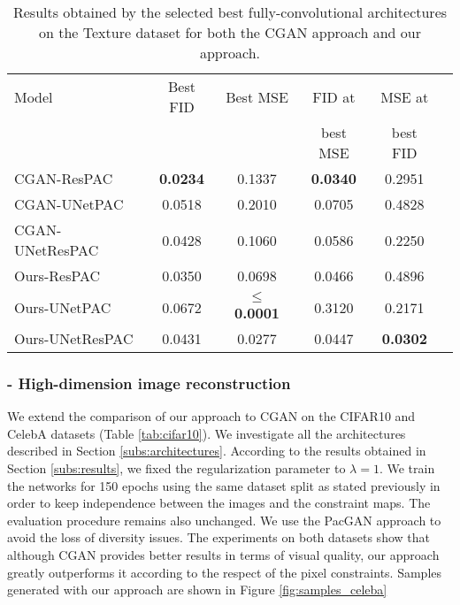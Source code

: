 \begin{table}[t]
	\centering
	\begin{tabular}{|l|c|c|c|c|c|}
		\hline
		Model           & Best FID & Best MSE & FID at & MSE at \\
		&&&best MSE & best FID  \\
		\hline
		CGAN-ResPAC &   \textbf{0.0234} & 0.1337 &  \textbf{0.0340} & 0.2951 \\
		CGAN-UNetPAC &  0.0518 & 0.2010 & 0.0705 & 0.4828\\
		CGAN-UNetResPAC & 0.0428 & 0.1060 & 0.0586 & 0.2250\\
		\hline
		Ours-ResPAC &  0.0350 & 0.0698 & 0.0466 & 0.4896\\
		Ours-UNetPAC &  0.0672 & \textbf{$\leq$ 0.0001}  & 0.3120 & 0.2171 \\
		Ours-UNetResPAC & 0.0431 & 0.0277 &0.0447 & \textbf{0.0302}\\
		\hline
	\end{tabular}
	
	\caption[Results obtained by the selected best fully-convolutional architectures]{Results obtained by the selected best fully-convolutional architectures on the Texture dataset for both the CGAN approach and our approach.}
	\label{tab:ablation-cgan}
\end{table}

\subsubsection{- High-dimension image reconstruction}
We extend the comparison of our approach to CGAN on the CIFAR10 and CelebA  datasets (Table \ref{tab:cifar10}). We investigate all the architectures described in Section \ref{subs:architectures}. According to the results obtained in Section \ref{subs:results}, we fixed the regularization parameter to $\lambda=1$. We train the networks for 150 epochs using the same dataset split as stated previously in order to keep independence between the images and the constraint maps. The evaluation procedure remains also unchanged. We use the PacGAN approach to avoid the loss of diversity issues. The experiments on both datasets show that although CGAN  provides better results in terms of visual quality, our approach greatly outperforms it according to the respect of the pixel constraints. Samples generated with our approach are shown in Figure \ref{fig:samples_celeba}


